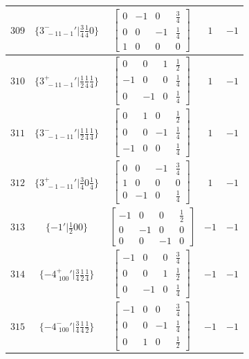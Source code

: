 \documentclass[fleqn,8pt]{jsarticle}
\begin{document}
\begin{longtable}{ccccc}
$ 309 $ & $ \{3^{-}_{\,\,-11-1}{}'|\frac{3}{4} \frac{1}{4} 0\} $ & $ \begin{bmatrix} 0 & -1 & 0 & \frac{3}{4} \\ 0 & 0 & -1 & \frac{1}{4} \\ 1 & 0 & 0 & 0 \end{bmatrix} $ & $ 1 $ & $ -1 $ \\ \hline
$ 310 $ & $ \{3^{+}_{\,\,-11-1}{}'|\frac{1}{2} \frac{1}{4} \frac{1}{4}\} $ & $ \begin{bmatrix} 0 & 0 & 1 & \frac{1}{2} \\ -1 & 0 & 0 & \frac{1}{4} \\ 0 & -1 & 0 & \frac{1}{4} \end{bmatrix} $ & $ 1 $ & $ -1 $ \\ \hline
$ 311 $ & $ \{3^{-}_{\,\,-1-11}{}'|\frac{1}{2} \frac{1}{4} \frac{1}{4}\} $ & $ \begin{bmatrix} 0 & 1 & 0 & \frac{1}{2} \\ 0 & 0 & -1 & \frac{1}{4} \\ -1 & 0 & 0 & \frac{1}{4} \end{bmatrix} $ & $ 1 $ & $ -1 $ \\ \hline
$ 312 $ & $ \{3^{+}_{\,\,-1-11}{}'|\frac{3}{4} 0 \frac{1}{4}\} $ & $ \begin{bmatrix} 0 & 0 & -1 & \frac{3}{4} \\ 1 & 0 & 0 & 0 \\ 0 & -1 & 0 & \frac{1}{4} \end{bmatrix} $ & $ 1 $ & $ -1 $ \\ \hline
$ 313 $ & $ \{-1{}'|\frac{1}{2} 0 0\} $ & $ \begin{bmatrix} -1 & 0 & 0 & \frac{1}{2} \\ 0 & -1 & 0 & 0 \\ 0 & 0 & -1 & 0 \end{bmatrix} $ & $ -1 $ & $ -1 $ \\ \hline
$ 314 $ & $ \{-4^{+}_{\,\,100}{}'|\frac{3}{4} \frac{1}{2} \frac{1}{4}\} $ & $ \begin{bmatrix} -1 & 0 & 0 & \frac{3}{4} \\ 0 & 0 & 1 & \frac{1}{2} \\ 0 & -1 & 0 & \frac{1}{4} \end{bmatrix} $ & $ -1 $ & $ -1 $ \\ \hline
$ 315 $ & $ \{-4^{-}_{\,\,100}{}'|\frac{3}{4} \frac{1}{4} \frac{1}{2}\} $ & $ \begin{bmatrix} -1 & 0 & 0 & \frac{3}{4} \\ 0 & 0 & -1 & \frac{1}{4} \\ 0 & 1 & 0 & \frac{1}{2} \end{bmatrix} $ & $ -1 $ & $ -1 $ \\ \hline

\end{longtable}
\end{document}
